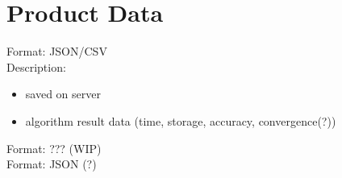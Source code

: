 \section{Product Data}

Format: JSON/CSV \\
Description: 
\begin{itemize}
	\item saved on server
	\item algorithm result data (time, storage, accuracy, convergence(?))
\end{itemize}

Format: ??? (WIP) \\

Format: JSON (?)
